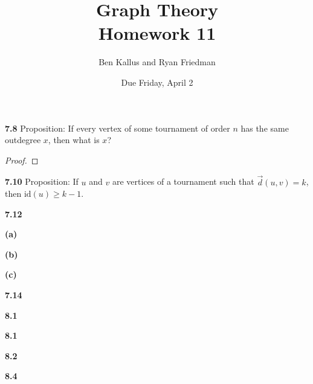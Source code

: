 \documentclass[12pt]{article}
\title{Graph Theory \\ Homework 11}
\author{Ben Kallus and Ryan Friedman}
\date{Due Friday, April 2}
\newcommand{\id}{\text{id}}
\begin{document}
\maketitle

\noindent\textbf{7.8} Proposition: If every vertex of some tournament of order $n$ has the same outdegree $x$, then what is $x$?
\begin{proof}
\end{proof}

\newpage\noindent\textbf{7.10} Proposition: If $u$ and $v$ are vertices of a tournament such that $\vec{d}(u,v) = k$, then $\id(u) \geq k - 1$.

	

\newpage\noindent\textbf{7.12}

\textbf{(a)}



\textbf{(b)}



\textbf{(c)}
	

\newpage\noindent\textbf{7.14}

	

\newpage\noindent\textbf{8.1}

	

\newpage\noindent\textbf{8.1}

	

\newpage\noindent\textbf{8.2}

	

\newpage\noindent\textbf{8.4}

	
\end{document}
